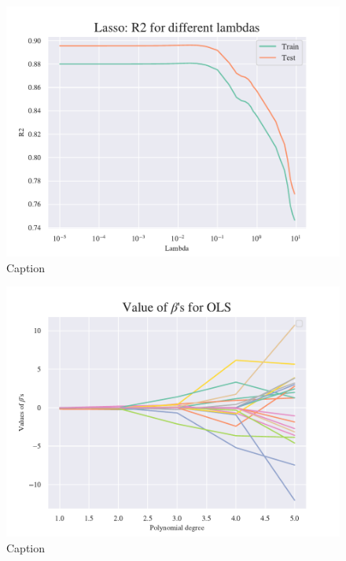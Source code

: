 \begin{figure}
    \centering
    \includegraphics[width=1\linewidth]{project_1/figures/figures_in_appendix/Lasso_R2_terrain.pdf}
    \caption{Caption}
    \label{fig:ref}
\end{figure}

\begin{figure}
    \centering
    \includegraphics[width=1\linewidth]{project_1/figures/figures_in_appendix/OLS_Betas_Franke_Noise.pdf}
    \caption{Caption}
    \label{fig:ref}
\end{figure}

